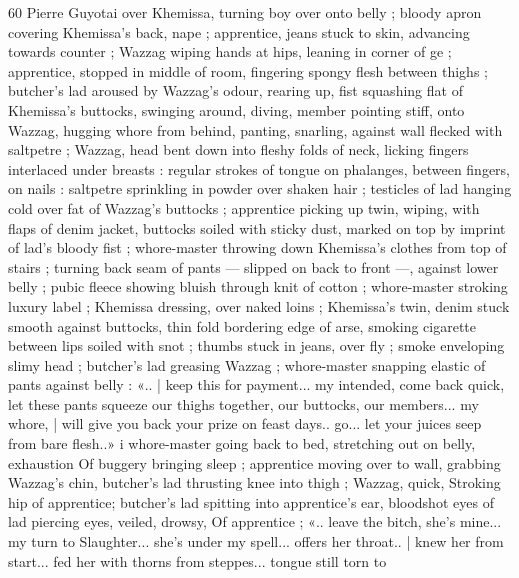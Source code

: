 60 Pierre Guyotai
over Khemissa, turning boy over onto belly ; bloody apron covering
Khemissa’s back, nape ; apprentice, jeans stuck to skin, advancing
towards counter ; Wazzag wiping hands at hips, leaning in corner of
ge ; apprentice, stopped in middle of room, fingering spongy
flesh between thighs ; butcher's lad aroused by Wazzag's odour,
rearing up, fist squashing flat of Khemissa’s buttocks, swinging
around, diving, member pointing stiff, onto Wazzag, hugging whore
from behind, panting, snarling, against wall flecked with saltpetre ;
Wazzag, head bent down into fleshy folds of neck, licking fingers
interlaced under breasts : regular strokes of tongue on phalanges,
between fingers, on nails : saltpetre sprinkling in powder over shaken
hair ; testicles of lad hanging cold over fat of Wazzag's buttocks ;
apprentice picking up twin, wiping, with flaps of denim jacket,
buttocks soiled with sticky dust, marked on top by imprint of lad’s
bloody fist ; whore-master throwing down Khemissa’s clothes from
top of stairs ; turning back seam of pants — slipped on back to front
—, against lower belly ; pubic fleece showing bluish through knit of
cotton ; whore-master stroking luxury label ; Khemissa dressing, over
naked loins ; Khemissa's twin, denim stuck smooth against buttocks,
thin fold bordering edge of arse, smoking cigarette between lips
soiled with snot ; thumbs stuck in jeans, over fly ; smoke enveloping
slimy head ; butcher's lad greasing Wazzag ; whore-master snapping
elastic of pants against belly : «.. | keep this for payment... my
intended, come back quick, let these pants squeeze our thighs
together, our buttocks, our members... my whore, | will give you back
your prize on feast days.. go... let your juices seep from bare flesh..»
i whore-master going back to bed, stretching out on belly, exhaustion
Of buggery bringing sleep ; apprentice moving over to wall, grabbing
Wazzag’s chin, butcher's lad thrusting knee into thigh ; Wazzag,
quick, Stroking hip of apprentice; butcher's lad spitting into
apprentice’s ear, bloodshot eyes of lad piercing eyes, veiled, drowsy,
Of apprentice ; «.. leave the bitch, she's mine... my turn to
Slaughter... she's under my spell... offers her throat.. | knew her from
start... fed her with thorns from steppes... tongue still torn to

